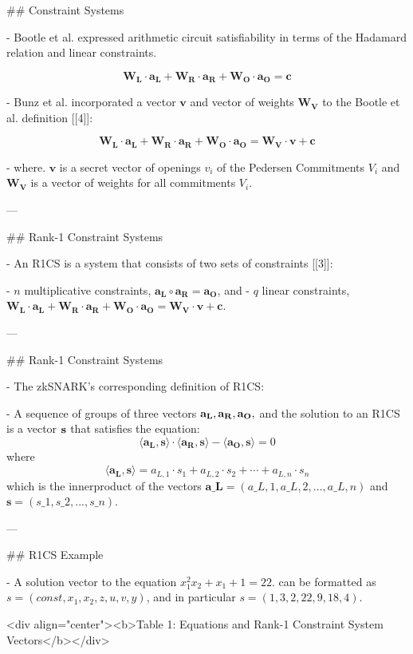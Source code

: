 ## Constraint Systems

- Bootle et al. expressed arithmetic circuit satisfiability in terms of the Hadamard relation and linear constraints. 

$$
\mathbf{W_L\cdot { a_L} + W_R\cdot { a_R} + W_O\cdot { a_O } = c }
$$  

- Bunz et al. incorporated a vector  $\mathbf{v}$  and vector of weights  $\mathbf{W_V}$ to the Bootle et al. definition [[4]]:

$$
\mathbf{W_L\cdot { a_L} + W_R\cdot { a_R} + W_O\cdot { a_O } = W_V\cdot { v + c} }
$$

- where. $ \mathbf{v}$  is a secret vector of openings ${v_i}$ of the Pedersen Commitments  $V_i$  and 
$\mathbf{W_V}$  is a vector of weights for all commitments  $V_i$.


---

## Rank-1 Constraint Systems 

- An R1CS is a system that consists of two sets of constraints [[3]]: 

  - ${ n}$  multiplicative constraints,  $ \mathbf{ a_L \circ a_R = a_O } $,  and
  - ${ q}$  linear constraints,  $\mathbf{W_L\cdot { a_L} + W_R\cdot { a_R} + W_O\cdot { a_O } = W_V\cdot { v + c} } $. 

--- 

## Rank-1 Constraint Systems 

- The zkSNARK's corresponding definition of R1CS: 

  - A sequence of groups of three vectors ${ \bf{a_L}}, { \bf{a_R}}, { \bf{a_O}} ,$ and the 
solution to an R1CS is a vector ${ \bf{s}}$ that satisfies the equation:
$$
{ \langle {\mathbf{a_L} , \mathbf{s}} \rangle \cdot \langle {\mathbf{a_R} , \mathbf{s}} \rangle - \langle {\mathbf{a_O} , \mathbf{s}} \rangle = 0 }
$$
where
$$\langle {\mathbf{a_L} , \mathbf{s}} \rangle = a_{L, 1} \cdot s_1 + a_{L, 2} \cdot s_2 + \cdots + a_{L, n} \cdot s_n $$
which is the innerproduct of the vectors 
$ \mathbf{a\_{L}}  =  (a\_{L,1}, a\_{L,2}, ... , a\_{L,n} )$
and
$ {\mathbf{s}} = (s\_1, s\_2, ... , s\_n) $.

--- 

## R1CS Example

- A solution vector to the equation ${x^2_1 x_2 + x_1 + 1 = 22}$. can be formatted as 
${ { s = ( const , x_1 , x_2 , z , u , v , y )}}$, and in particular  ${ { s = ( 1 , 3 , 2 , 22 , 9 , 18 , 4 )}}$. 

<div align="center"><b>Table 1: Equations and Rank-1 Constraint System Vectors</b></div>  


